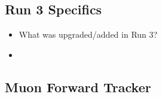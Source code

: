 \subsection{Run 3 Specifics}
\begin{itemize}
    \item What was upgraded/added in Run 3?
    \item 
\end{itemize}

\subsection{Muon Forward Tracker}